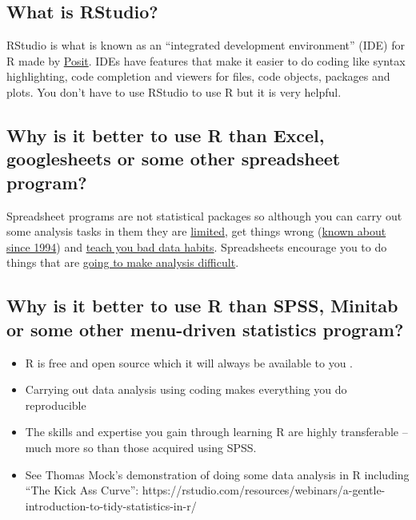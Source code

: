 \documentclass[
  letterpaper,
  DIV=11,
  numbers=noendperiod]{scrreprt}
\providecommand{\tightlist}{%
  \setlength{\itemsep}{0pt}\setlength{\parskip}{0pt}}\usepackage{longtable,booktabs,array}
\begin{document}
\hypertarget{what-is-rstudio}{%
\subsection{What is RStudio?}\label{what-is-rstudio}}

RStudio is what is known as an ``integrated development environment''
(IDE) for R made by \href{https://posit.co/}{Posit}. IDEs have features
that make it easier to do coding like syntax highlighting, code
completion and viewers for files, code objects, packages and plots. You
don't have to use RStudio to use R but it is very helpful.

\hypertarget{why-is-it-better-to-use-r-than-excel-googlesheets-or-some-other-spreadsheet-program}{%
\subsection{Why is it better to use R than Excel, googlesheets or some
other spreadsheet
program?}\label{why-is-it-better-to-use-r-than-excel-googlesheets-or-some-other-spreadsheet-program}}

Spreadsheet programs are not statistical packages so although you can
carry out some analysis tasks in them they are
\href{https://www.gapintelligence.com/blog/understanding-r-programming-over-excel-for-data-analysis/}{limited},
get things wrong
(\href{https://www.sciencedirect.com/science/article/abs/pii/0167947394901775}{known
about since 1994}) and
\href{https://www.teampay.co/blog/biggest-excel-mistakes-of-all-time}{teach
you bad data habits}. Spreadsheets encourage you to do things that are
\href{https://datacarpentry.org/2015-05-03-NDIC/excel-ecology/02-common-mistakes.html}{going
to make analysis difficult}.

\hypertarget{why-is-it-better-to-use-r-than-spss-minitab-or-some-other-menu-driven-statistics-program}{%
\subsection{Why is it better to use R than SPSS, Minitab or some other
menu-driven statistics
program?}\label{why-is-it-better-to-use-r-than-spss-minitab-or-some-other-menu-driven-statistics-program}}

\begin{itemize}
\tightlist
\item
  R is free and open source which it will always be available to you .
\item
  Carrying out data analysis using coding makes everything you do
  reproducible
\item
  The skills and expertise you gain through learning R are highly
  transferable -- much more so than those acquired using SPSS.
\item
  See Thomas Mock's demonstration of doing some data analysis in R
  including ``The Kick Ass Curve'':
  https://rstudio.com/resources/webinars/a-gentle-introduction-to-tidy-statistics-in-r/
\end{itemize}
\end{document}

